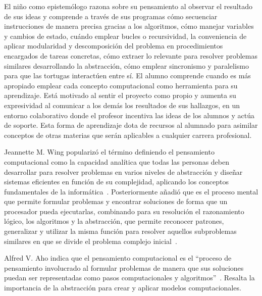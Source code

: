 \documentclass[a4paper, 12pt]{book}
\begin{document}
El niño como epistemólogo razona sobre su pensamiento al observar el resultado de sus ideas y comprende a través de sus programas cómo secuenciar instrucciones de manera precisa gracias a los algoritmos, cómo manejar variables y cambios de estado, cuándo emplear bucles o recursividad, la conveniencia de aplicar modularidad y descomposición del problema en procedimientos encargados de tareas concretas, cómo extraer lo relevante para resolver problemas similares desarrollando la abstracción, cómo emplear sincronismo y paralelismo para que las tortugas interactúen entre sí. El alumno comprende cuando es más apropiado emplear cada concepto computacional como herramienta para su aprendizaje. Está motivado al sentir el proyecto como propio y aumenta su expresividad al comunicar a los demás los resultados de sus hallazgos, en un entorno colaborativo donde el profesor incentiva las ideas de los alumnos y actúa de soporte. Esta forma de aprendizaje dota de recursos al alumnado para asimilar conceptos de otras materias que serán aplicables a cualquier carrera profesional. 

Jeannette M. Wing popularizó el término definiendo el pensamiento computacional como la capacidad analítica que todas las personas deben desarrollar para resolver problemas en varios niveles de abstracción y diseñar sistemas eficientes en función de su complejidad, aplicando los conceptos fundamentales de la informática~\cite{wing2006computational}. Posteriormente añadió que es el proceso mental que permite formular problemas y encontrar soluciones de forma que un procesador pueda ejecutarlas, combinando para su resolución el razonamiento lógico, los algoritmos y la abstracción, que permite reconocer patrones, generalizar y utilizar la misma función para resolver aquellos subproblemas similares en que se divide el problema complejo inicial~\cite{wing2011research}.

Alfred V. Aho indica que el pensamiento computacional es el ``proceso de pensamiento involucrado al formular problemas de manera que sus soluciones puedan ser representadas como pasos computacionales y algoritmos''~\cite[p. 832]{aho2012computation}. Resalta la importancia de la abstracción para crear y aplicar modelos computacionales.
\end{document}
